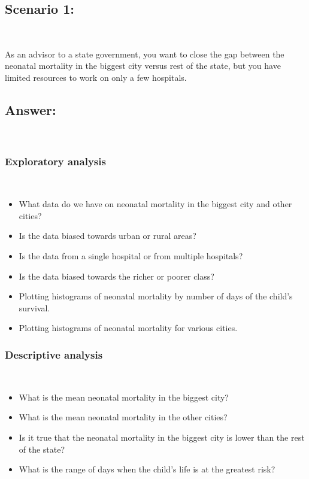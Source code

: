 \documentclass[12pt]{article}
\begin{document}
\subsection*{Scenario 1:}\\
    \item As an advisor to a state government, you want to close the gap between the neonatal mortality in the biggest city versus rest of the state, but you have limited resources to work on only a few hospitals.\\
    \subsection*{Answer:}\\
    \subsubsection*{Exploratory analysis}\\

    \begin{itemize}
        \item What data do we have on neonatal mortality in the biggest city and other cities?
        \item Is the data biased towards urban or rural areas?
        \item Is the data from a single hospital or from multiple hospitals?
        \item Is the data biased towards the richer or poorer class?
        \item Plotting histograms of neonatal mortality by number of days of the child's survival.
        \item Plotting histograms of neonatal mortality for various cities.    
    \end{itemize}

    \subsubsection*{Descriptive analysis}\\
    \begin{itemize}
        \item What is the mean neonatal mortality in the biggest city?
        \item What is the mean neonatal mortality in the other cities?
        \item Is it true that the neonatal mortality in the biggest city is lower than the rest of the state?
        \item What is the range of days when the child's life is at the greatest risk?
    \end{itemize}
\end{document}
